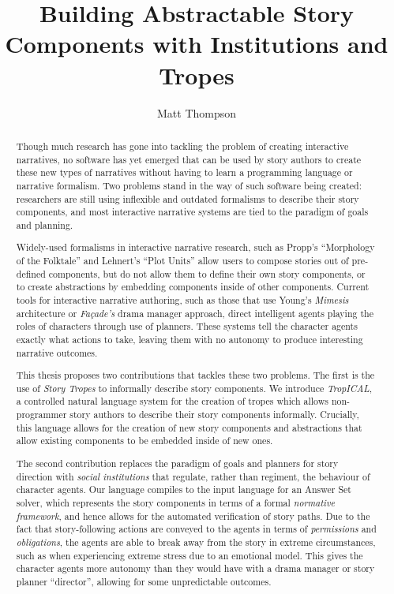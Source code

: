 \documentclass[11pt]{report}
\title{Building Abstractable Story Components with Institutions and Tropes}
\author{Matt Thompson}
\begin{document}
\maketitle

\clearpage
\tableofcontents
\clearpage



\begin{abstract}
  Though much research has gone into tackling the problem of creating
  interactive narratives, no software has yet emerged that can be used by
  story authors to create these new types of narratives without having to learn
  a programming language or narrative formalism. Two problems stand in the way of such software being created: researchers are
  still using inflexible and outdated formalisms to describe their story
  components, and most interactive narrative systems are tied to the paradigm of
  goals and planning.

  Widely-used formalisms in interactive narrative research, such as Propp's
  ``Morphology of the Folktale'' and Lehnert's
  ``Plot Units'' allow users to compose stories out of
  pre-defined components, but do not allow them to define their own story
  components, or to create abstractions by embedding components inside of other
  components. Current tools for interactive narrative
  authoring, such as those that use Young's \emph{Mimesis} architecture or
  \emph{Fa\c{c}ade's} drama manager approach, direct intelligent agents playing
  the roles of characters through use of planners. These systems tell the character
  agents exactly what actions to take, leaving them with no autonomy to produce
  interesting narrative outcomes.

  This thesis proposes two contributions that tackles these two problems. The
  first is the use of \emph{Story Tropes} to informally describe story
  components. We introduce \emph{TropICAL}, a controlled natural language system
  for the creation of tropes which
  allows non-programmer story authors to describe their story components informally. Crucially, this
  language allows for the creation of new story components and abstractions
  that allow existing components to be embedded inside of new ones.

  The second contribution replaces the paradigm of goals and planners for story
  direction with \emph{social institutions} that regulate,
  rather than regiment, the behaviour of character agents. Our language
  compiles to the input language for an Answer Set solver, which represents the
  story components in terms of a formal \emph{normative framework}, and hence allows for
  the automated verification of story paths. Due to the fact that
  story-following actions are conveyed to the agents in terms of
  \emph{permissions} and \emph{obligations}, the agents are able to break away
  from the story in extreme circumstances, such as when experiencing extreme
  stress due to an emotional model. This gives the character agents more
  autonomy than they would have with a drama manager or story planner
  ``director'', allowing for some unpredictable outcomes.


\end{abstract}
\end{document}
